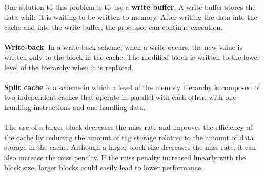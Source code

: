 \documentclass[letterpaper,c12pt]{article}
\begin{document}
One solution to this problem is to use a \textbf{write buffer}. A write buffer stores the data while it is waiting to be written to memory. After writing the data into the cache and into the write buffer, the processor can continue execution.\\\\
\textbf{Write-back}: In a write-back scheme, when a write occurs, the new value is written only to the block in the cache. The modified block is written to the lower level of the hierarchy when it is replaced.\\\\
\textbf{Split cache} is a scheme
in which a level of the memory hierarchy
is composed of two independent caches that operate in parallel with each other, with one handling instructions and one handling data.\\\\
The use of a larger block decreases the miss rate and improves the efficiency of the cache by reducing the amount of tag storage relative to the amount of data storage in the cache. Although a larger block size decreases the miss rate, it can also increase the miss penalty. If the miss penalty increased linearly with the block size, larger blocks could easily lead to lower performance.
\end{document}
